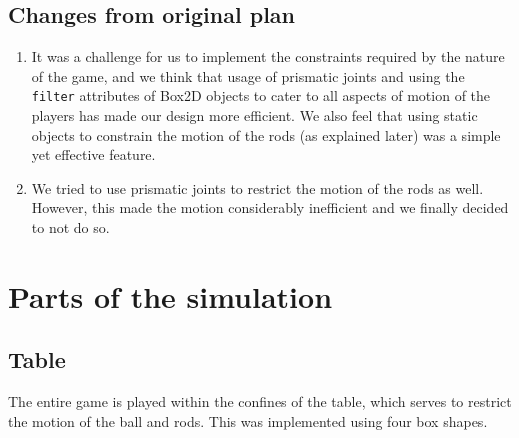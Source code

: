 \documentclass{article}
\begin{document}
\subsection{Changes from original plan}
\begin{enumerate}
\item It was a challenge for us to implement the constraints required by the nature of the game, and we think that usage of prismatic joints and using the \texttt{filter} attributes of Box2D objects to cater to all aspects of motion of the players has made our design more efficient. We also feel that using static objects to constrain the motion of the rods (as explained later) was a simple yet effective feature.\\

\item We tried to use prismatic joints to restrict the motion of the rods as well. However, this made the motion considerably inefficient and we finally decided to not do so.
\end{enumerate}
\section{Parts of the simulation}

\subsection{Table}
The entire game is played within the confines of the table, which serves to restrict the motion of the ball and rods. This was implemented using four box shapes.\\
\end{document}
